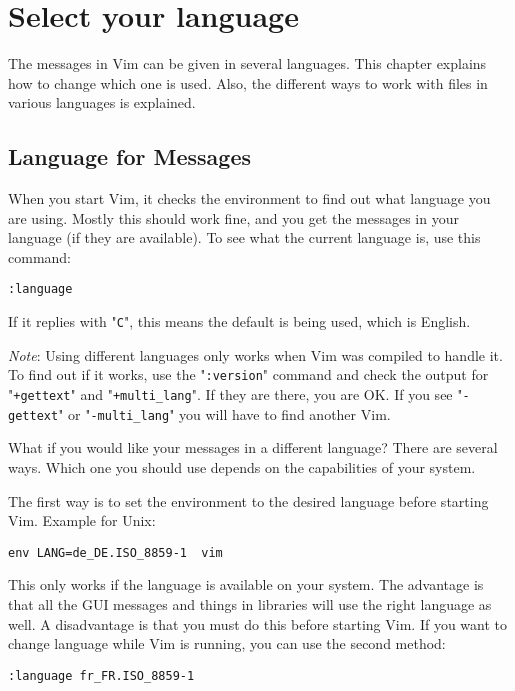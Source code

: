 \section{Select your language}
The messages in Vim can be given in several languages.
This chapter explains how to change which one is used.
Also, the different ways to work with files in various languages is explained.
\subsection{Language for Messages}
When you start Vim, it checks the environment to find out what language you are using.
Mostly this should work fine, and you get the messages in your language (if they are available).
To see what the current language is, use this command:

\begin{Verbatim}[samepage=true]
 :language
\end{Verbatim}

If it replies with "\verb!C!", this means the default is being used, which is English.

\emph{Note}:
Using different languages only works when Vim was compiled to handle it.
To find out if it works, use the "\verb!:version!" command and check the output for "\verb!+gettext!" and "\verb!+multi_lang!".
If they are there, you are OK.
If you see "\verb!-gettext!" or "\verb!-multi_lang!" you will have to find another Vim.

What if you would like your messages in a different language?  There are several ways.
Which one you should use depends on the capabilities of your system.

The first way is to set the environment to the desired language before starting Vim.
Example for Unix:

\begin{Verbatim}[samepage=true]
 env LANG=de_DE.ISO_8859-1  vim
\end{Verbatim}

This only works if the language is available on your system.
The advantage is that all the GUI messages and things in libraries will use the right language as well.
A disadvantage is that you must do this before starting Vim.
If you want to change language while Vim is running, you can use the second method:

\begin{Verbatim}[samepage=true]
 :language fr_FR.ISO_8859-1
\end{Verbatim}

